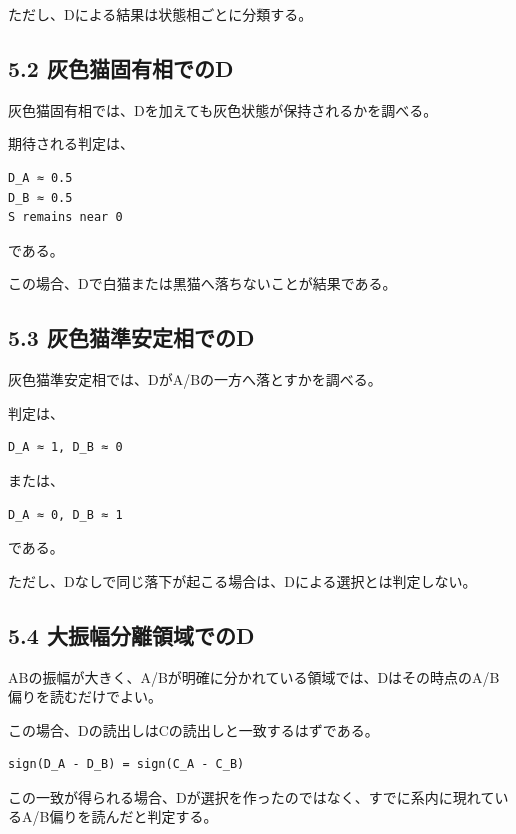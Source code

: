 \documentclass{article}
\begin{document}
ただし、Dによる結果は状態相ごとに分類する。

\subsection{5.2
灰色猫固有相でのD}\label{ux7070ux8272ux732bux56faux6709ux76f8ux3067ux306ed}

灰色猫固有相では、Dを加えても灰色状態が保持されるかを調べる。

期待される判定は、

\begin{verbatim}
D_A ≈ 0.5
D_B ≈ 0.5
S remains near 0
\end{verbatim}

である。

この場合、Dで白猫または黒猫へ落ちないことが結果である。

\subsection{5.3
灰色猫準安定相でのD}\label{ux7070ux8272ux732bux6e96ux5b89ux5b9aux76f8ux3067ux306ed}

灰色猫準安定相では、DがA/Bの一方へ落とすかを調べる。

判定は、

\begin{verbatim}
D_A ≈ 1, D_B ≈ 0
\end{verbatim}

または、

\begin{verbatim}
D_A ≈ 0, D_B ≈ 1
\end{verbatim}

である。

ただし、Dなしで同じ落下が起こる場合は、Dによる選択とは判定しない。

\subsection{5.4
大振幅分離領域でのD}\label{ux5927ux632fux5e45ux5206ux96e2ux9818ux57dfux3067ux306ed}

ABの振幅が大きく、A/Bが明確に分かれている領域では、Dはその時点のA/B偏りを読むだけでよい。

この場合、Dの読出しはCの読出しと一致するはずである。

\begin{verbatim}
sign(D_A - D_B) = sign(C_A - C_B)
\end{verbatim}

この一致が得られる場合、Dが選択を作ったのではなく、すでに系内に現れているA/B偏りを読んだと判定する。
\end{document}
